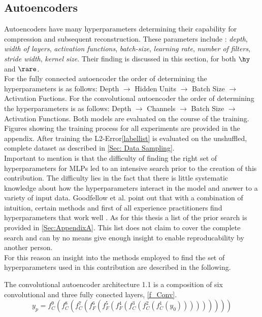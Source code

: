 \subsection{Autoencoders}
Autoencoders have many hyperparameters determining their capability for compression and subsequent reconstruction. These parameters include : \textit{depth}, \textit{width of layers}, \textit{activation functions}, \textit{batch-size}, \textit{learning rate}, \textit{number of filters}, \textit{stride width}, \textit{kernel size}. Their finding is discussed in this section, for both $\hy$ and $\rare$.\\
For the fully connected autoencoder the order of determining the hyperparameters is as follows:
Depth $\rightarrow$ Hidden Units $\rightarrow$ Batch Size $\rightarrow$  Activation Fuctions.
For the convolutional autoencoder the order of determining the hyperparameters is as follows:
Depth $\rightarrow$ Channels $\rightarrow$ Batch Size $\rightarrow$ Activation Functions.
Both models are evaluated on the course of the training. Figures showing the training process for all experiments are provided in the appendix. After training the L2-Error\cref{labellist} is evaluated on the unshuffled, complete dataset as described in \cref{Sec: Data Sampling}.\\
Important to mention is that the difficulty of finding the right set of hyperparameters for MLPs led to an intensive search prior to the creation of this contribution. The difficulty lies in the fact that there is little systematic knowledge about how the hyperparameters interact in the model and answer to a variety of input data. Goodfellow et al. point out that with a combination of intuition, certain methods and first of all experience practitioners find hyperparameters that work well \cite{Goodfellow}. As for this thesis a list of the prior search is provided in \cref{Sec:AppendixA}. This list does not claim to cover the complete search and can by no means give enough insight to enable reproducability by another person.\\
For this reason an insight into the methods employed to find the set of hyperparameters used in this contribution are described in the following. 

The convolutional autoencoder architecture 1.1 is a composition of six convolutional and three fully conected layers, \cref{f_Conv}.
\begin{equation}
y_p = f_{C}^9(f_{C}^8(f_{C}^7(f_{F}^6(f_{F}^5(f_{F}^4(f_{C}^3(f_{C}^2(f_{C}^1(y_0)))))))))
\label{f_Conv}
\end{equation}